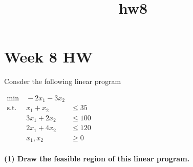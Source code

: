 \documentclass[11pt]{article}
\title{hw8}
\begin{document}
    
    
    \maketitle
    
    

    
    \hypertarget{week-8-hw}{%
\section{Week 8 HW}\label{week-8-hw}}

Consder the following linear program

\(\begin{aligned} \text{min} & \ -2x_1 - 3x_2 \\ \text{s.t.} & \ x_1 + x_2 & \le 35 \\  & \ 3x_1 + 2x_2 & \le 100 \\  & \ 2x_1 + 4x_2 & \le 120 \\  & \ x_1,x_2 & \ge 0 \end{aligned}\)

\hypertarget{draw-the-feasible-region-of-this-linear-program.}{%
\paragraph{(1) Draw the feasible region of this linear
program.}\label{draw-the-feasible-region-of-this-linear-program.}}
\end{document}
